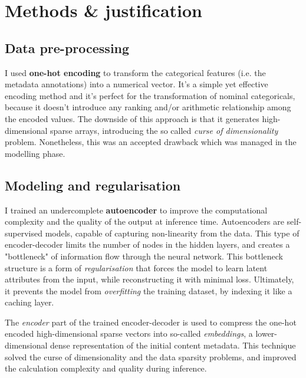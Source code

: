 
\section{Methods \& justification}

\subsection{Data pre-processing}

I used \textbf{one-hot encoding} to transform the categorical features (i.e. the metadata annotations) into a numerical vector.
It's a simple yet effective encoding method and it's perfect for the transformation of nominal categoricals,
because it doesn't introduce any ranking and/or arithmetic relationship among the
encoded values. The downside of this approach is that it generates high-dimensional sparse arrays,
introducing the so called \textit{curse of dimensionality} problem. Nonetheless, this was an accepted drawback which was
managed in the modelling phase.

\subsection{Modeling and regularisation}

I trained an undercomplete \textbf{autoencoder} to improve the computational complexity and the quality of the output at inference time.
Autoencoders are self-supervised models, capable of capturing non-linearity from the data. This type of encoder-decoder limits
the number of nodes in the hidden layers, and creates a "bottleneck" of information flow through the neural network.
This bottleneck structure is a form of \textit{regularisation} that forces the model to learn latent attributes from the input,
while reconstructing it with minimal loss. Ultimately, it prevents the model from \textit{overfitting} the training dataset,
by indexing it like a caching layer.

The \textit{encoder} part of the trained encoder-decoder is used to compress the one-hot encoded high-dimensional sparse vectors into
so-called \textit{embeddings}, a lower-dimensional dense representation of the initial content metadata.
This technique solved the curse of dimensionality and the data sparsity problems, and improved the calculation complexity and quality
during inference.

